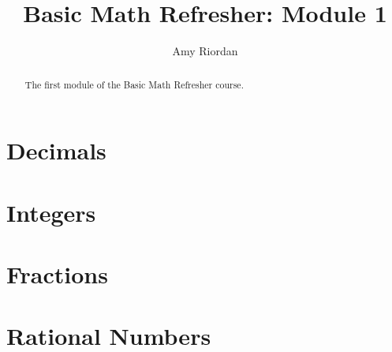 \documentclass{xourse}
\title{Basic Math Refresher: Module 1}
\author{Amy Riordan}
\begin{document}
\begin{abstract}
    The first module of the Basic Math Refresher course.
\end{abstract}
\maketitle

\part{Decimals}


\part{Integers}


\part{Fractions}


\part{Rational Numbers}

\end{document}
